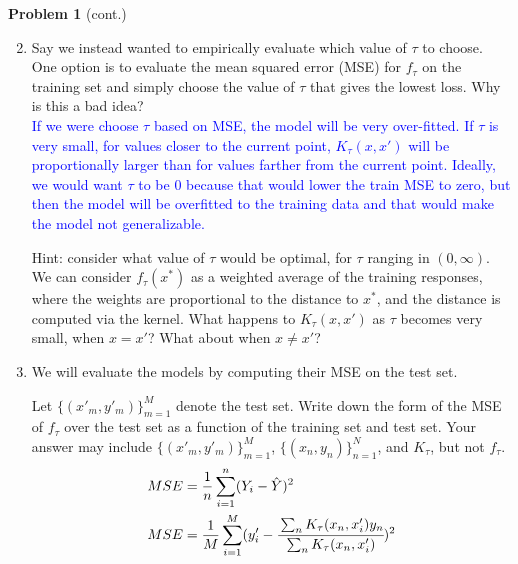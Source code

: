 \documentclass[submit]{harvardml}
\begin{document}
\begin{framed}
\noindent\textbf{Problem 1} (cont.)\\
\begin{enumerate}
\setcounter{enumi}{1}

\item Say we instead wanted to empirically evaluate which value of $\tau$ to choose. One option is to evaluate the mean squared error (MSE) for $f_{\tau}$ on the training set and simply choose the value of $\tau$ that gives the lowest loss. Why is this a bad idea?\\
\textcolor{blue}{If we were choose $\tau$ based on MSE, the model will be very over-fitted. If $\tau$ is very small, for values closer to the current point, $K_\tau(x, x')$ will be proportionally larger than for values farther from the current point. Ideally, we would want $\tau$ to be $0$ because that would lower the train MSE to zero, but then the model will be overfitted to the training data and that would make the model not generalizable.}
    
Hint: consider what value of $\tau$ would be optimal, for $\tau$ ranging in $(0, \infty)$. We can consider $f_\tau(x^*)$ as a weighted average of the training responses, where the weights are proportional to the distance to $x^*$, and the distance is computed via the kernel. What happens to $K_\tau(x, x')$ as $\tau$ becomes very small, when $x = x'$? What about when $x \neq x'$?

\item We will evaluate the models by computing their MSE on the test set. 

Let $\{(x'_m, y'_m)\}_{m = 1} ^M$ denote the test set. Write down the form of the MSE of $f_\tau$ over the test set as a function of the training set and test set. Your answer may include $\{(x'_m, y'_m)\}_{m = 1} ^M$, $\{(x_n, y_n)\}_{n = 1} ^N$, and $K_\tau$, but not $f_\tau$.\\
\textcolor{blue}{
\begin{align*}
    MSE &= \frac{1}{n}\sum_{i = 1}^{n}(Y_{i} - \hat{Y})^{2}\\
    MSE &= \frac{1}{M}\sum_{i = 1}^{M}(y_{i}' - \cfrac{\sum_{n} K_\tau(x_n,x'_{i}) y_n}{\sum_{n} K_\tau(x_n, x'_{i})})^{2}\\
\end{align*}
}


\end{enumerate}
\end{framed}
\end{document}

